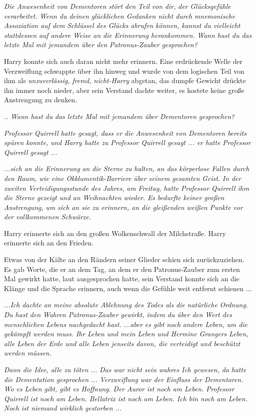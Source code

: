 \emph{Die Anwesenheit von Dementoren stört den Teil von dir, der Glücksgefühle
verarbeitet. Wenn du deinen glücklichen Gedanken nicht durch mnemonische
Assoziation auf dem Schlüssel des Glücks abrufen können, kannst du vielleicht
stattdessen auf andere Weise an die Erinnerung herankommen. Wann hast du das
letzte Mal mit jemandem über den Patronus-Zauber gesprochen?}

Harry konnte sich auch daran nicht mehr erinnern. Eine erdrückende Welle der
Verzweiflung schwappte über ihn hinweg und wurde von dem logischen Teil von ihm
als \emph{unzuverlässig, fremd, nicht-Harry} abgetan, das dumpfe Gewicht drückte
ihn immer noch nieder, aber sein Verstand dachte weiter, es kostete keine große
Anstrengung zu denken.

\emph{.. Wann hast du das letzte Mal mit jemandem über Dementoren gesprochen?}

\emph{Professor Quirrell hatte gesagt, dass er die Anwesenheit von Dementoren
bereits spüren konnte, und Harry hatte zu Professor Quirrell gesagt ... er hatte
Professor Quirrell gesagt ...}

\emph{...sich an die Erinnerung an die Sterne zu halten, an das körperlose
Fallen durch den Raum, wie eine Okklumentik-Barriere über seinem gesamten Geist.
In der zweiten Verteidigungsstunde des Jahres, am Freitag, hatte Professor
Quirrell ihm die Sterne gezeigt und an Weihnachten wieder. Es bedurfte keiner
großen Anstrengung, um sich an sie zu erinnern, an die gleißenden weißen Punkte
vor der vollkommenen Schwärze.}

Harry erinnerte sich an den großen Wolkenschwall der Milchstraße. Harry
erinnerte sich an den Frieden.

Etwas von der Kälte an den Rändern seiner Glieder schien sich zurückzuziehen. Es
gab Worte, die er an dem Tag, an dem er den Patronus-Zauber zum ersten Mal
gewirkt hatte, laut ausgesprochen hatte, sein Verstand konnte sich an die Klänge
und die Sprache erinnern, auch wenn die Gefühle weit entfernt schienen ...

\emph{...Ich dachte an meine absolute Ablehnung des Todes als die natürliche
Ordnung. Du hast den Wahren Patronus-Zauber gewirkt, indem du über den Wert des
menschlichen Lebens nachgedacht hast. ...aber es gibt noch andere Leben, um die
gekämpft werden muss. Ihr Leben und mein Leben und Hermine Grangers Leben, alle
Leben der Erde und alle Leben jenseits davon, die verteidigt und beschützt
werden müssen.}

\emph{Dann die Idee, alle zu töten ... Das war nicht sein wahres Ich gewesen, da
hatte die Dementation gesprochen ... Verzweiflung war der Einfluss der
Dementoren. Wo es Leben gibt, gibt es Hoffnung. Der Auror ist noch am Leben.
Professor Quirrell ist noch am Leben. Bellatrix ist noch am Leben. Ich bin noch
am Leben. Noch ist niemand wirklich gestorben ...}

